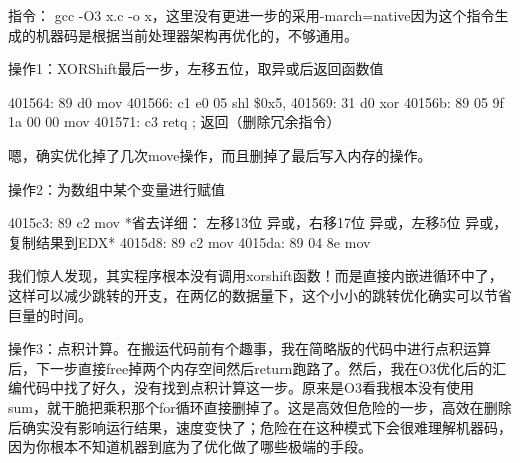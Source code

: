 \documentclass[11pt]{article}
\begin{document}
指令： gcc -O3  x.c -o x，这里没有更进一步的采用-march=native因为这个指令生成的机器码是根据当前处理器架构再优化的，不够通用。 


操作1：XORShift最后一步，左移五位，取异或后返回函数值
\begin{commandline}
401564: 89 d0                 mov    %
401566: c1 e0 05              shl    \$0x5,%
401569: 31 d0                 xor    %
40156b: 89 05 9f 1a 00 00     mov    %
401571: c3                    retq                       ; 返回（删除冗余指令）
\end{commandline}
嗯，确实优化掉了几次move操作，而且删掉了最后写入内存的操作。


操作2：为数组中某个变量进行赋值
\begin{commandline}
4015c3: 89 c2                 mov    %
*省去详细： 左移13位 异或，右移17位 异或，左移5位 异或，复制结果到EDX*
4015d8: 89 c2                 mov    %
4015da: 89 04 8e              mov    %
\end{commandline}
我们惊人发现，其实程序根本没有调用xorshift函数！而是直接内嵌进循环中了，这样可以减少跳转的开支，在两亿的数据量下，这个小小的跳转优化确实可以节省巨量的时间。


操作3：点积计算。在搬运代码前有个趣事，我在简略版的代码中进行点积运算后，下一步直接free掉两个内存空间然后return跑路了。然后，我在O3优化后的汇编代码中找了好久，没有找到点积计算这一步。原来是O3看我根本没有使用sum，就干脆把乘积那个for循环直接删掉了。这是高效但危险的一步，高效在删除后确实没有影响运行结果，速度变快了；危险在在这种模式下会很难理解机器码，因为你根本不知道机器到底为了优化做了哪些极端的手段。
\end{document}
